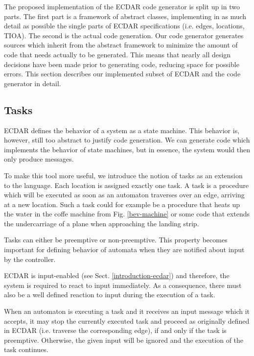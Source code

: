 The proposed implementation of the ECDAR code generator is split up
in two parts. The first part is a framework of abstract classes, implementing
in as much detail as possible the single parts of ECDAR specifications
(i.e. edges, locations, TIOA). The second is the actual code generation.
Our code generator generates sources which inherit from the abstract
framework to minimize the amount of code that needs actually to be
generated. This means that nearly all design decisions have been made
prior to generating code, reducing space for possible errors. This
section describes our implemented subset of ECDAR and the code generator
in detail.

\subsection{Tasks}
\label{subsec:tasks}

ECDAR defines the behavior of a system as a state machine. This behavior
is, however, still too abstract to justify code generation. We can
generate code which implements the behavior of state machines, but
in essence, the system would then only produce messages.

To make this tool more useful, we introduce the notion of tasks as an extension
to the language. Each location is assigned exactly one task. A task is a
procedure which will be executed as soon as an automaton traverses over an edge,
arriving at a new location. Such a task could for example be a procedure that
heats up the water in the coffe machine from Fig. \ref{bev-machine} or some code
that extends the undercarriage of a plane when approaching the landing strip.

Tasks can either be preemptive or non-preemptive. This property becomes
important for defining behavior of automata when they are notified
about input by the controller.

ECDAR is input-enabled (see Sect. \ref{introduction-ecdar}) and therefore,
the system is required to react to input immediately. As a consequence,
there must also be a well defined reaction to input during the execution
of a task.

When an automaton is executing a task and it receives an input message
which it accepts, it may stop the currently executed task and proceed
as originally defined in ECDAR (i.e. traverse the corresponding edge),
if and only if the task is preemptive. Otherwise, the given input
will be ignored and the execution of the task continues.

